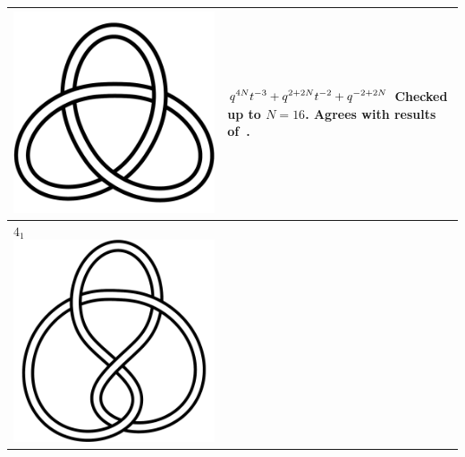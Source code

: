 \documentclass{compositio}
\theoremstyle{definition}
\numberwithin{equation}{section}
\begin{document}
{\begin{longtable}{p{}|p{}}
\includegraphics[scale=0.07,angle=0]{knot3_1.pdf} 
&
\newline 
$
\displaystyle{%
q^{4N} t^{-3} + q^{2 + 2N} t^{-2} + q^{-2 + 2N}
}
$
\newline\newline\newline
Checked up to $N=16$. Agrees with results of~\cite{r0508510, r0607544}. 
\\
\hline
$4_{1}$ 
\includegraphics[scale=0.07,angle=0]{knot4_1.pdf} 

\end{longtable}}
\end{document}
